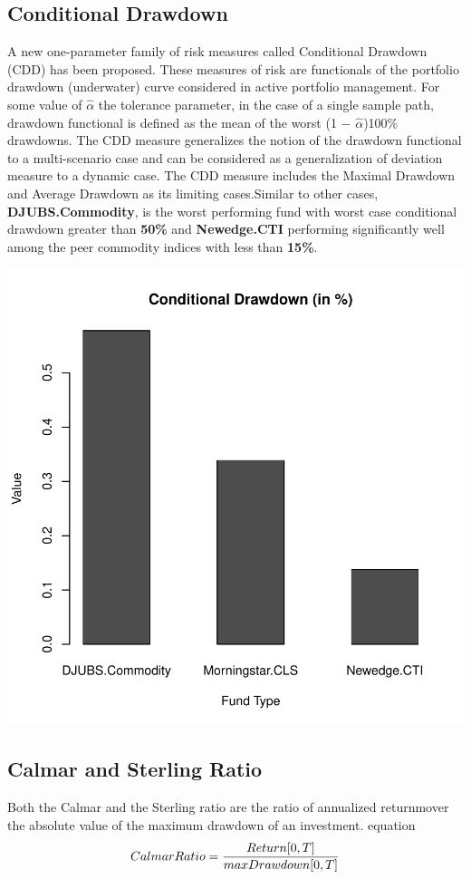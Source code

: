 \documentclass[12pt,letterpaper,english]{article}
\begin{document}
\subsection{Conditional Drawdown}
A new one-parameter family of risk measures called Conditional Drawdown (CDD) has
been proposed. These measures of risk are functionals of the portfolio drawdown (underwater) curve considered in active portfolio management. For some value of $\hat{\alpha}$ the tolerance parameter, in the case of a single sample path, drawdown functional is defined as the mean of the worst (1 \(-\) $\hat{\alpha}$)100\% drawdowns. The CDD measure generalizes the notion of the drawdown functional to a multi-scenario case and can be considered as a generalization of deviation measure to a dynamic case. The CDD measure includes the Maximal Drawdown and Average Drawdown as its limiting cases.Similar to other cases, \textbf{DJUBS.Commodity}, is the worst performing fund with worst case conditional drawdown greater than \textbf{50\%} and \textbf{Newedge.CTI} performing significantly well among the peer commodity indices with less than \textbf{15\%}.

\includegraphics{CommodityReport-007}
\subsection{Calmar and Sterling Ratio}
Both the Calmar and the Sterling ratio are the ratio of annualized returnmover the absolute value of the maximum drawdown of an investment.
{equation}
\begin{equation}
 Calmar Ratio  =  \frac{Return [0,T]}{max Drawdown  [0,T]} \\
\end{equation}
\end{document}

